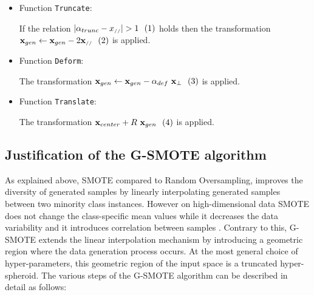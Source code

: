 \documentclass[parskip=full]{scrartcl}
\newcommand{\inlineeqnum}{\refstepcounter{equation}~~\mbox{(\theequation)}}
\begin{document}
\begin{itemize}
	 \item Function \texttt{Truncate}:
	 
	 	If the relation \( |\alpha_{trunc} - x_{\scriptscriptstyle//}| > 1 \inlineeqnum\label{eqn:condition} \) holds then the transformation \( \textbf{x}_{gen} \leftarrow \textbf{x}_{gen} - 2 \textbf{x}_{\scriptscriptstyle//} \inlineeqnum\label{eqn:truncate} \) is applied.
	
	\item Function \texttt{Deform}: 
			
		The transformation \( \textbf{x}_{gen} \leftarrow \textbf{x}_{gen} - \alpha_{def} \  \textbf{x}_{\bot} \inlineeqnum\label{eqn:deform} \) is applied.
			
	\item Function \texttt{Translate}:
	
		The transformation \( \textbf{x}_{center} +  R \ \textbf{x}_{gen} \inlineeqnum\label{eqn:translate} \) is applied.
	
\end{itemize}

\subsection{Justification of the G-SMOTE algorithm}

As explained above, SMOTE compared to Random Oversampling, improves the diversity of generated samples by linearly interpolating generated samples between two minority class instances. However on high-dimensional data SMOTE does not change the class-specific mean values while it decreases the data variability and it introduces correlation between samples \cite{Blagus2013}. Contrary to this, G-SMOTE extends the linear interpolation mechanism by introducing a geometric region where the data generation process occurs. At the most general choice of hyper-parameters, this geometric region of the input space is a truncated hyper-spheroid. The various steps of the G-SMOTE algorithm can be described in detail as follows:
\end{document}
